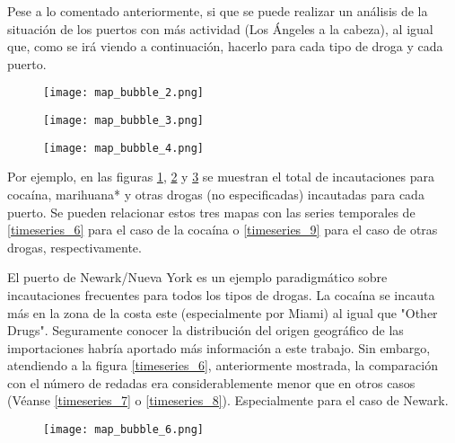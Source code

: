 \documentclass[12pt]{article}
\begin{document}
		Pese a lo comentado anteriormente, si que se puede realizar un análisis de la situación de los puertos con más actividad (Los Ángeles a la cabeza), al igual que, como se irá viendo a continuación, hacerlo para cada tipo de droga y cada puerto.
		
		\begin{figure}[H]
			\caption{\label{map_bubble_2} }
			\centering
			\hspace*{1cm}
			\texttt{[image: map\_bubble\_2.png]}
		\end{figure}
	
		\begin{figure}[H]
			\caption{\label{map_bubble_3} }
			\centering
			\hspace*{1cm}
			\texttt{[image: map\_bubble\_3.png]}
		\end{figure}
	
		\begin{figure}[H]
			\caption{\label{map_bubble_4} }
			\centering
			\hspace*{1cm}
			\texttt{[image: map\_bubble\_4.png]}
		\end{figure}
	
		Por ejemplo, en las figuras \ref{map_bubble_2}, \ref{map_bubble_3} y \ref{map_bubble_4} se muestran el total de incautaciones para cocaína, marihuana* y otras drogas (no especificadas) incautadas para cada puerto. Se pueden relacionar estos tres mapas con las series temporales de \ref{timeseries_6} para el caso de la cocaína o  \ref{timeseries_9} para el caso de otras drogas, respectivamente.
		
		El puerto de Newark/Nueva York es un ejemplo paradigmático sobre incautaciones frecuentes para todos los tipos de drogas. La cocaína se incauta más en la zona de la costa este (especialmente por Miami) al igual que "Other Drugs". Seguramente conocer la distribución del origen geográfico de las importaciones habría aportado más información a este trabajo. Sin embargo, atendiendo a la figura \ref{timeseries_6}, anteriormente mostrada, la comparación con el número de redadas era considerablemente menor que en otros casos (Véanse \ref{timeseries_7} o \ref{timeseries_8}). Especialmente para el caso de Newark.
		
		\begin{figure}[H]
			\caption{\label{map_bubble_6} }
			\centering
			\hspace*{1cm}
			\texttt{[image: map\_bubble\_6.png]}
		\end{figure}
		
\end{document}
